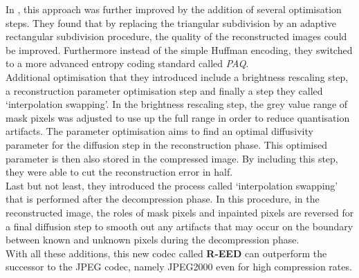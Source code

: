 In \cite{schmaltz09}, this approach was further improved by the addition of several optimisation
steps. They found that by replacing the triangular subdivision by an adaptive rectangular
subdivision procedure, the quality of the reconstructed images could be improved. Furthermore
instead of the simple Huffman encoding, they switched to a more advanced entropy coding standard
called \textit{PAQ}\cite{paq}. \\
Additional optimisation that they introduced include a brightness rescaling
step, a reconstruction parameter optimisation step and finally a step they called `interpolation
swapping'.
In the brightness rescaling step, the grey value range of mask pixels was adjusted to use up the 
full range in order to reduce quantisation artifacts.
The parameter optimisation aims to find an optimal diffusivity parameter for the diffusion step in
the reconstruction phase. This optimised parameter is then also stored in the compressed image.
By including this step, they were able to cut the reconstruction error in half.\\
Last but not least, they introduced the process called `interpolation swapping' that is performed
after the decompression phase. In this procedure, in the reconstructed image, the roles of mask
pixels and inpainted pixels are reversed for a final diffusion step to smooth out any artifacts
that may occur on the boundary between known and unknown pixels during the decompression phase.\\
With all these additions, this new codec called \textbf{R-EED} can outperform the
successor to the JPEG codec, namely JPEG2000 even for high compression rates.

